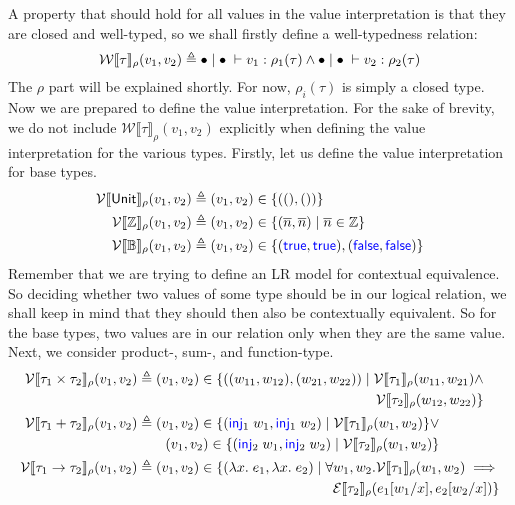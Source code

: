\documentclass[a4paper, 11pt]{report}
\theoremstyle{definition}
\newcommand{\Keyword}[1]{{\color{blue} \mathsf{#1}}}
\newcommand{\var}{x}
\newcommand{\expr}{e}
\newcommand{\val}{v}
\newcommand{\valB}{w}
\newcommand{\TT}{()}
\newcommand{\Num}[1]{\overline{#1}}
\newcommand{\True}{\Keyword{true}}
\newcommand{\False}{\Keyword{false}}
\newcommand{\Inj}[1]{\Keyword{inj}_{#1}\;}
\newcommand{\subst}[3]{#1{\left[#3 \middle/ #2 \right]}}
\newcommand{\Tunit}{\mathsf{Unit}}
\newcommand{\Tint}{\mathbb{Z}}
\newcommand{\Tbool}{\mathbb{B}}
\newcommand{\Tprod}[2]{#1 \times #2}
\newcommand{\Tsum}[2]{#1 + #2}
\newcommand{\Tfunc}[2]{#1 \rightarrow #2}
\newcommand{\typ}{\tau}
\newcommand{\emptenv}{\bullet}
\newcommand{\empvenv}{\bullet}
\newcommand{\jdg}[4]{#1 \; | \; #2 \; \vdash #3 : #4}
\newcommand{\WtInp}[2]{\mathcal{W} \llbracket #1 \rrbracket_{#2}}
\newcommand{\WtInpGen}[2]{\WtInp{#1}{#2}(\val_1, \val_2)}
\newcommand{\ValInp}[2]{\mathcal{V} \llbracket #1 \rrbracket_{#2}}
\newcommand{\ValInpGen}[2]{\ValInp{#1}{#2}(\val_1, \val_2)}
\newcommand{\ExpInp}[2]{\mathcal{E} \llbracket #1 \rrbracket_{#2}}
\begin{document}
A property that should hold for all values in the value interpretation is that they are closed and well-typed, so we shall firstly define a well-typedness relation:
\begin{equation*}
  \WtInpGen{\typ}{\rho} \triangleq \jdg{\emptenv}{\empvenv}{\val_1}{\rho_1(\typ)} \land \jdg{\emptenv}{\empvenv}{\val_2}{\rho_2(\typ)}\\
\end{equation*}
The $\rho$ part will be explained shortly. For now, $\rho_i(\typ)$ is simply a closed type. Now we are prepared to define the value interpretation. For the sake of brevity, we do not include $\WtInpGen{\typ}{\rho}$ explicitly when defining the value interpretation for the various types. Firstly, let us define the value interpretation for base types.
\begin{align*}
  \ValInpGen{\Tunit}{\rho}  &\triangleq (\val_1, \val_2) \in \{(\TT, \TT)\}\\
  \ValInpGen{\Tint}{\rho}   &\triangleq (\val_1, \val_2) \in \{(\Num{n}, \Num{n}) \mid \Num{n} \in \Tint\}\\
  \ValInpGen{\Tbool}{\rho}  &\triangleq (\val_1, \val_2) \in \{(\True, \True), (\False, \False)\}
\end{align*}
Remember that we are trying to define an LR model for contextual equivalence. So deciding whether two values of some type should be in our logical relation, we shall keep in mind that they should then also be contextually equivalent. So for the base types, two values are in our relation only when they are the same value.\\
Next, we consider product-, sum-, and function-type.
\begin{align*}
  \ValInpGen{\Tprod{\typ_1}{\typ_2}}{\rho}  &\triangleq 
  \begin{aligned}[t]
    (\val_1, \val_2) \in \{((\valB_{11}, \valB_{12}), (\valB_{21}, \valB_{22})) \mid \ValInp{\typ_1}{\rho}(\valB_{11}, \valB_{21}) \land\\ \ValInp{\typ_2}{\rho}(\valB_{12}, \valB_{22})\}
  \end{aligned}\\
  \ValInpGen{\Tsum{\typ_1}{\typ_2}}{\rho}   &\triangleq 
  \begin{aligned}[t]
    (\val_1, \val_2) \in \{(\Inj{1} \valB_1, \Inj{1} \valB_2) \mid \ValInp{\typ_1}{\rho}(\valB_1, \valB_2)\} \lor \\
    (\val_1, \val_2) \in \{(\Inj{2} \valB_1, \Inj{2} \valB_2) \mid \ValInp{\typ_2}{\rho}(\valB_1, \valB_2)\}
  \end{aligned}\\
  \ValInpGen{\Tfunc{\typ_1}{\typ_2}}{\rho}  &\triangleq 
  \begin{aligned}[t]
    (\val_1, \val_2) \in \{(\fun \var . \expr_1, \fun \var . \expr_2) \mid \forall \valB_1, \valB_2 . \ValInp{\typ_1}{\rho}(\valB_{1}, \valB_{2}) \implies\\
    \ExpInp{\typ_2}{\rho}(\subst{\expr_1}{\var}{\valB_1}, \subst{\expr_2}{\var}{\valB_2})\}
  \end{aligned}
\end{align*}
\end{document}
